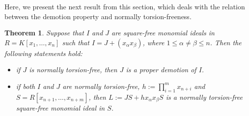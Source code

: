\documentclass[11pt]{amsart}
\newtheorem{theorem}{Theorem}[section]
\begin{document}

Here, we present the next result from this section, which deals with the relation between  the demotion property and normally torsion-freeness. 

\begin{theorem}  \label{NTT-2}
Suppose that  $I$ and $J$  are    square-free monomial ideals in $R=K[x_1, \ldots, x_n]$ such that    $I=J+(x_\alpha x_\beta)$, where 
 $1\leq \alpha \neq \beta \leq n$. Then the following statements hold:
\begin{itemize}
\item[(i)] if $J$ is  normally torsion-free, then  $J$ is a proper demotion of $I$. 
\item[(ii)] if both $I$ and  $J$ are   normally torsion-free,  $h:=\prod_{i=1}^mx_{n+i}$ and  $S=R[x_{n+1}, \ldots, x_{n+m}]$, then $L:=JS+ hx_\alpha x_\beta S$  is a   normally  torsion-free square-free monomial ideal in $S$.   
\end{itemize}
\end{theorem}
 
\end{document}

